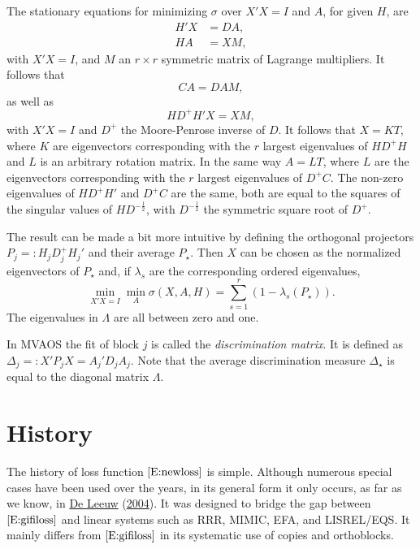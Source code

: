 \documentclass[
  12pt,
]{book}
\begin{document}
The stationary equations for minimizing \(\sigma\) over \(X'X=I\) and \(A\), for given \(H\), are
\begin{align}
H'X&=DA,\\
HA&=XM,
\end{align}
with \(X'X=I\), and \(M\) an \(r\times r\) symmetric matrix of Lagrange multipliers. It follows that
\begin{equation}
CA=DAM,\label{E:stata}
\end{equation}
as well as
\begin{equation}
HD^+H'X=XM,\label{E:statx}
\end{equation}
with \(X'X=I\) and \(D^+\) the Moore-Penrose inverse of \(D\). It follows that \(X=KT\), where \(K\) are eigenvectors corresponding with the \(r\)
largest eigenvalues of \(HD^+H\) and \(L\) is an arbitrary rotation matrix. In the same way \(A=LT\), where \(L\) are the eigenvectors corresponding with the \(r\) largest eigenvalues of \(D^+C\). The non-zero eigenvalues of \(HD^+H'\) and \(D^+C\) are the same, both are equal to the squares of the singular values of \(HD^{-\frac12}\), with \(D^{-\frac12}\) the symmetric square root of \(D^+\).

The result can be made a bit more intuitive by defining the orthogonal projectors \(P_j=:H_jD_j^+H_j'\) and their average \(P_\star\). Then
\(X\) can be chosen as the normalized eigenvectors of \(P_\star\) and, if \(\lambda_s\) are the corresponding ordered eigenvalues,
\begin{equation}
\min_{X'X=I}\min_A\sigma(X,A,H)=\sum_{s=1}^r(1-\lambda_s(P_\star)).
\end{equation}
The eigenvalues in \(\Lambda\) are all between zero and one.

In MVAOS the fit of block \(j\) is called the \emph{discrimination matrix}. It is defined as \(\Delta_j=:X'P_jX=A_j'D_jA_j\). Note that the average discrimination measure \(\Delta_\star\) is equal to the diagonal matrix \(\Lambda\).

\hypertarget{history}{%
\section{History}\label{history}}

The history of loss function \(\eqref{E:newloss}\) is simple. Although numerous special cases have been used over the years, in its general form it only occurs, as far as we know, in \protect\hyperlink{ref-deleeuw_C_04a}{De Leeuw} (\protect\hyperlink{ref-deleeuw_C_04a}{2004}). It was designed to bridge the gap between \(\eqref{E:gifiloss}\) and linear systems such as RRR, MIMIC, EFA, and LISREL/EQS.
It mainly differs from \(\eqref{E:gifiloss}\) in its systematic use of copies and orthoblocks.
\end{document}
